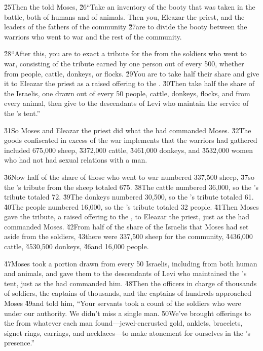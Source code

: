 \v{25}Then the  told Moses, \v{26}``Take an inventory of the booty that was taken in the battle, both of humans and of animals. Then you, Eleazar the priest, and the leaders of the fathers of the community \v{27}are to divide the booty between the warriors who went to war and the rest of the community.

\v{28}``After this, you are to exact a tribute for the  from the soldiers who went to war, consisting of the tribute earned by one person out of every 500, whether from people, cattle, donkeys, or flocks. \v{29}You are to take half their share and give it to Eleazar the priest as a raised offering to the . \v{30}Then take half the share of the Israelis, one drawn out of every 50 people, cattle, donkeys, flocks, and from every animal, then give to the descendants of Levi who maintain the service of the 's tent.''

\v{31}So Moses and Eleazar the priest did what the  had commanded Moses. \v{32}The goods confiscated in excess of the war implements that the warriors had gathered included 675,000 sheep, \v{33}72,000 cattle, \v{34}61,000 donkeys, and \v{35}32,000 women who had not had sexual relations with a man.

\v{36}Now half of the share of those who went to war numbered 337,500 sheep, \v{37}so the 's tribute from the sheep totaled 675. \v{38}The cattle numbered 36,000, so the 's tribute totaled 72. \v{39}The donkeys numbered 30,500, so the 's tribute totaled 61. \v{40}The people numbered 16,000, so the 's tribute totaled 32 people. \v{41}Then Moses gave the tribute, a raised offering to the , to Eleazar the priest, just as the  had commanded Moses. \v{42}From half of the share of the Israelis that Moses had set aside from the soldiers, \v{43}there were 337,500 sheep for the community, \v{44}36,000 cattle, \v{45}30,500 donkeys, \v{46}and 16,000 people.

\v{47}Moses took a portion drawn from every 50 Israelis, including from both human and animals, and gave them to the descendants of Levi who maintained the 's tent, just as the  had commanded him. \v{48}Then the officers in charge of thousands of soldiers, the captains of thousands, and the captains of hundreds approached Moses \v{49}and told him, ``Your servants took a count of the soldiers who were under our authority. We didn't miss a single man. \v{50}We've brought offerings to the  from whatever each man found---jewel-encrusted gold, anklets, bracelets, signet rings, earrings, and necklaces---to make atonement for ourselves in the 's presence.''

